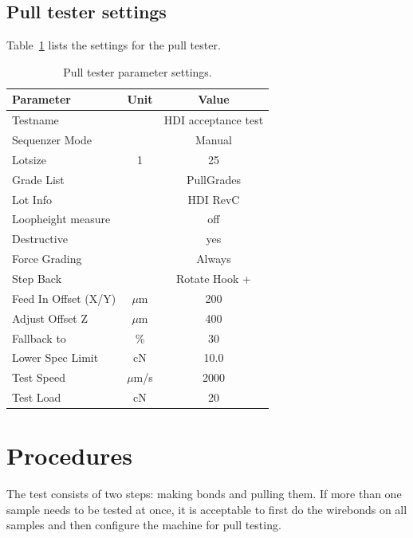 \documentclass[10pt]{unlsilabsop}
\begin{document}
\subsection{Pull tester settings}
Table~\ref{tbl:testpar} lists the settings for the pull tester.

\begin{table}[h]
\begin{center}
\caption{Pull tester parameter settings.}
\label{tbl:testpar}

\bigskip

\begin{tabular}{lcc}
\toprule
Parameter          & Unit   & Value \\
\midrule
\multicolumn{2}{l}{Testname}           & HDI acceptance test \\
\multicolumn{2}{l}{Sequenzer Mode}     & Manual\\
Lotsize            & 1      & 25 \\
\multicolumn{2}{l}{Grade List}         & PullGrades\\
\multicolumn{2}{l}{Lot Info}           & HDI RevC\\
\multicolumn{2}{l}{Loopheight measure} & off\\
\multicolumn{2}{l}{Destructive}        & yes\\
\multicolumn{2}{l}{Force Grading}      & Always\\
\multicolumn{2}{l}{Step Back}          & Rotate Hook +\\
Feed In Offset (X/Y) & $\mu$m & 200\\
Adjust Offset Z      & $\mu$m & 400 \\
Fallback to          & \%     & 30 \\
Lower Spec Limit     & cN     & 10.0 \\
Test Speed           & $\mu$m/s & 2000 \\
Test Load            & cN     & 20 \\
    \bottomrule
\end{tabular}
\end{center}
\end{table}

\section{Procedures}
The test consists of two steps: making bonds and pulling them. If more than one sample needs to be tested at once, it is acceptable to first do the wirebonds on all samples and then configure the machine for pull testing.
\end{document}
